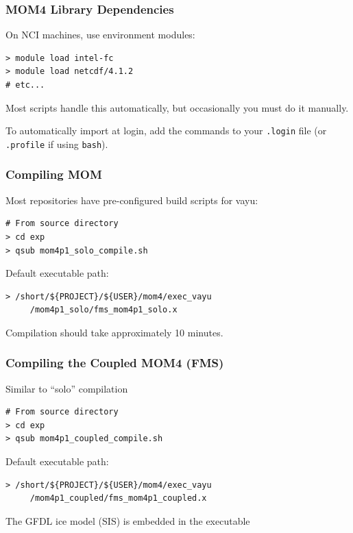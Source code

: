 \documentclass{beamer}
\begin{document}
\begin{frame}[fragile]
    \frametitle{MOM4 Library Dependencies}
    
    On NCI machines, use environment modules:
    \begin{lstlisting}
> module load intel-fc
> module load netcdf/4.1.2
# etc...
    \end{lstlisting}
    Most scripts handle this automatically, but occasionally you must do it
    manually. 

    \vspace{10pt}

    To automatically import at login, add the commands to your
    \lstinline|.login| file (or \lstinline|.profile| if using
    \lstinline|bash|).
\end{frame}

\begin{frame}[fragile]
    \frametitle{Compiling MOM}
    
    Most repositories have pre-configured build scripts for vayu:
    \begin{lstlisting}
# From source directory
> cd exp
> qsub mom4p1_solo_compile.sh
    \end{lstlisting}
    
    Default executable path:
    \begin{lstlisting}
> /short/${PROJECT}/${USER}/mom4/exec_vayu
     /mom4p1_solo/fms_mom4p1_solo.x
    \end{lstlisting}
    
    Compilation should take approximately 10 minutes. 
\end{frame}

\begin{frame}[fragile]
    \frametitle{Compiling the Coupled MOM4 (FMS)}
    
    Similar to ``solo'' compilation
    \begin{lstlisting}
# From source directory
> cd exp
> qsub mom4p1_coupled_compile.sh
    \end{lstlisting}
    
    Default executable path:
    \begin{lstlisting}
> /short/${PROJECT}/${USER}/mom4/exec_vayu
     /mom4p1_coupled/fms_mom4p1_coupled.x
    \end{lstlisting}
    The GFDL ice model (SIS) is embedded in the executable
\end{frame}
\end{document}
